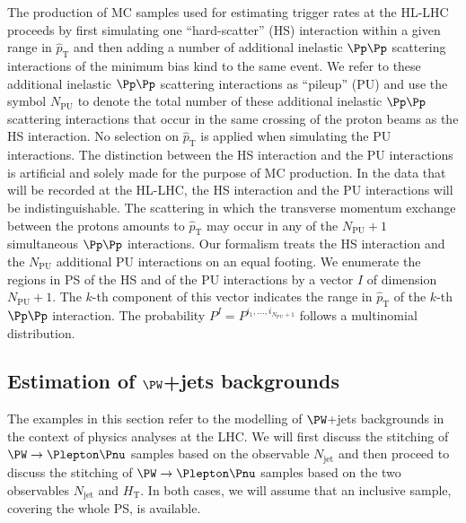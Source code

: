 \documentclass[twocolumn,epjc3]{svjour3}
\newcommand{\PZggx}{\ensuremath{\PZ/\Pgamma^{*}}\xspace}
\newcommand{\pThat}{\ensuremath{\hat{p}_{\textrm{T}}}\xspace}
\newcommand{\HT}{\ensuremath{H_{\mathrm{T}}}\xspace}
\newcommand{\jet}{\ensuremath{\textrm{jet}}\xspace}
\newcommand{\pileup}{\ensuremath{\textrm{PU}}\xspace}
\begin{document}
The production of MC samples used for estimating trigger rates at the HL-LHC
proceeds by first simulating one ``hard-scatter'' (HS) interaction within a given range in $\pThat$
and then adding a number of additional inelastic $\Pp\Pp$ scattering interactions of the minimum bias kind to the same event.
We refer to these additional inelastic $\Pp\Pp$ scattering interactions as ``pileup'' (PU)
and use the symbol $N_{\pileup}$ to denote the total number of these additional inelastic $\Pp\Pp$ scattering interactions 
that occur in the same crossing of the proton beams as the HS interaction.
No selection on $\pThat$ is applied when simulating the PU interactions.
The distinction between the HS interaction and the PU interactions is artificial and solely made for the purpose of MC production.
In the data that will be recorded at the HL-LHC, the HS interaction and the PU interactions will be indistinguishable.
The scattering in which the transverse momentum exchange between the protons amounts to $\pThat$ may occur in any of the $N_{\pileup} + 1$ simultaneous $\Pp\Pp$ interactions.
Our formalism treats the HS interaction and the $N_{\pileup}$ additional PU interactions on an equal footing.
We enumerate the regions in PS of the HS and of the PU interactions by a vector $I$ of dimension $N_{\pileup} + 1$.
The $k$-th component of this vector indicates the range in $\pThat$ of the $k$-th $\Pp\Pp$ interaction.
The probability $P^{I} = P^{i_{1},\dots,i_{N_{\pileup}+1}}$ follows a multinomial distribution.


\subsection{Estimation of \texorpdfstring{$\PW$}{W}+jets backgrounds}
\label{sec:examples_background_yield}

The examples in this section refer to the modelling of 
$\PW$+jets backgrounds in the context of physics analyses at the LHC.
We will first discuss the stitching of $\PW \to \Plepton\Pnu$ samples
based on the observable $N_{\jet}$
and then proceed to discuss the stitching of $\PW \to \Plepton\Pnu$ samples based on the two observables $N_{\jet}$ and $\HT$.
In 
both cases, we will assume that an inclusive sample, covering the whole PS, is available.
\end{document}
